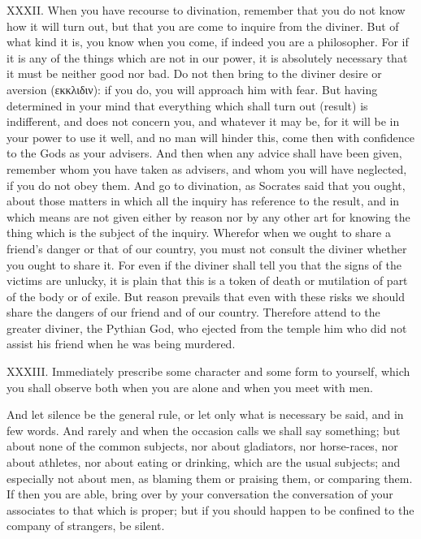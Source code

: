 XXXII. When you have recourse to divination, remember that you do not know how it will turn out, but that you are come to inquire from the diviner. But of what kind it is, you know when you come, if indeed you are a philosopher. For if it is any of the things which are not in our power, it is absolutely necessary that it must be neither good nor bad. Do not then bring to the diviner desire or aversion (εκκλιδιν): if you do, you will approach him with fear. But having determined in your mind that everything which shall turn out (result) is indifferent, and does not concern you, and whatever it may be, for it will be in your power to use it well, and no man will hinder this, come then with confidence to the Gods as your advisers. And then when any advice shall have been given, remember whom you have taken as advisers, and whom you will have neglected, if you do not obey them. And go to divination, as Socrates said that you ought, about those matters in which all the inquiry has reference to the result, and in which means are not given either by reason nor by any other art for knowing the thing which is the subject of the inquiry. Wherefor when we ought to share a friend's danger or that of our country, you must not consult the diviner whether you ought to share it. For even if the diviner shall tell you that the signs of the victims are unlucky, it is plain that this is a token of death or mutilation of part of the body or of exile. But reason prevails that even with these risks we should share the dangers of our friend and of our country. Therefore attend to the greater diviner, the Pythian God, who ejected from the temple him who did not assist his friend when he was being murdered.



XXXIII. Immediately prescribe some character and some form to yourself, which you shall observe both when you are alone and when you meet with men.

And let silence be the general rule, or let only what is necessary be said, and in few words. And rarely and when the occasion calls we shall say something; but about none of the common subjects, nor about gladiators, nor horse-races, nor about athletes, nor about eating or drinking, which are the usual subjects; and especially not about men, as blaming them or praising them, or comparing them. If then you are able, bring over by your conversation the conversation of your associates to that which is proper; but if you should happen to be confined to the company of strangers, be silent.

